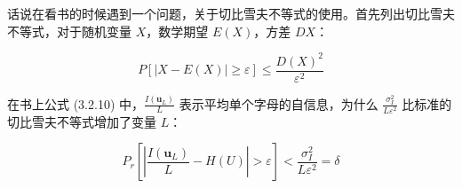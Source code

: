 \documentclass{ctexart}
\begin{document}
话说在看书的时候遇到一个问题，关于切比雪夫不等式的使用。首先列出切比雪夫不等式，对于随机变量 $X$，数学期望 $E(X)$，方差 $DX$：

\begin{equation}
    P[|X - E(X)| \ge \varepsilon] \le \frac{D(X)^2}{\varepsilon^2}
\end{equation}

在书上公式 (3.2.10) 中，$\frac{I(\textbf{u}_L)}{L}$ 表示平均单个字母的自信息，为什么 $\frac{\sigma_I^2}{L\varepsilon^2}$ 比标准的切比雪夫不等式增加了变量 $L$：

\begin{equation}
    P_r[|\frac{I(\textbf{u}_L)}{L} - H(U)| > \varepsilon] < \frac{\sigma_I^2}{L\varepsilon^2} = \delta
\end{equation}
\end{document}
